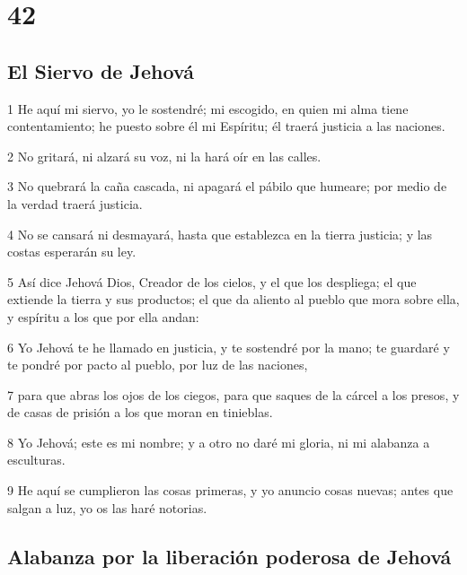\chapter{42}

\section*{El Siervo de Jehová}

\par 1 He aquí mi siervo, yo le sostendré; mi escogido, en quien mi alma tiene contentamiento; he puesto sobre él mi Espíritu; él traerá justicia a las naciones. 
\par 2 No gritará, ni alzará su voz, ni la hará oír en las calles.
\par 3 No quebrará la caña cascada, ni apagará el pábilo que humeare; por medio de la verdad traerá justicia.
\par 4 No se cansará ni desmayará, hasta que establezca en la tierra justicia; y las costas esperarán su ley.
\par 5 Así dice Jehová Dios, Creador de los cielos, y el que los despliega; el que extiende la tierra y sus productos; el que da aliento al pueblo que mora sobre ella, y espíritu a los que por ella andan:
\par 6 Yo Jehová te he llamado en justicia, y te sostendré por la mano; te guardaré y te pondré por pacto al pueblo, por luz de las naciones, 
\par 7 para que abras los ojos de los ciegos, para que saques de la cárcel a los presos, y de casas de prisión a los que moran en tinieblas.
\par 8 Yo Jehová; este es mi nombre; y a otro no daré mi gloria, ni mi alabanza a esculturas.
\par 9 He aquí se cumplieron las cosas primeras, y yo anuncio cosas nuevas; antes que salgan a luz, yo os las haré notorias.

\section*{Alabanza por la liberación poderosa de Jehová}

